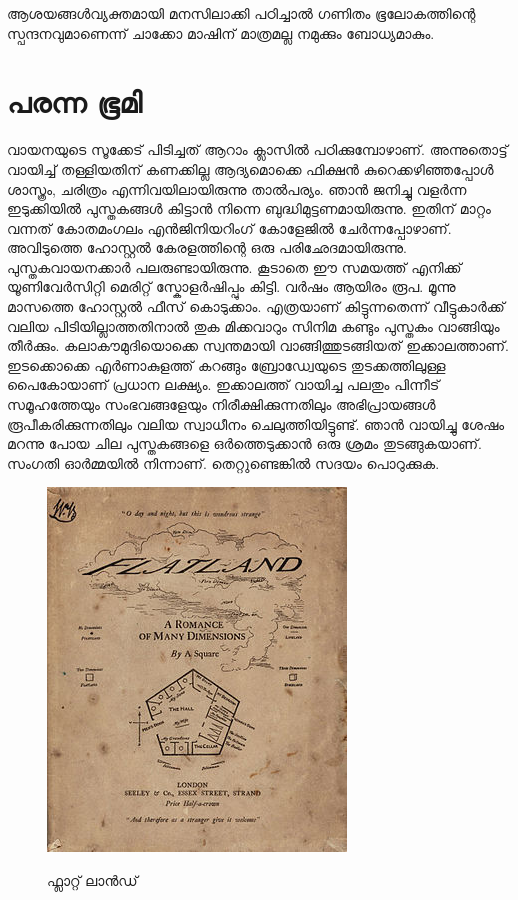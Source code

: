 \documentclass[10pt,a4paper]{report}
\begin{document}
      ആശയങ്ങൾവ്യക്തമായി മനസിലാക്കി പഠിച്ചാൽ ഗണിതം ഭൂലോകത്തിന്റെ സ്പന്ദനവുമാണെന്ന് ചാക്കോ മാഷിന് മാത്രമല്ല നമുക്കും ബോധ്യമാകും.
  
\section{പരന്ന ഭൂമി }

വായനയുടെ സൂക്കേട് പിടിച്ചത് ആറാം ക്ലാസിൽ പഠിക്കുമ്പോഴാണ്. അന്നുതൊട്ട് വായിച്ച് തള്ളിയതിന് കണക്കില്ല ആദ്യമൊക്കെ ഫിക്ഷൻ കുറെക്കഴിഞ്ഞപ്പോൾ ശാസ്ത്രം, ചരിത്രം എന്നിവയിലായിരുന്നു താൽപര്യം. ഞാൻ ജനിച്ചു വളർന്ന ഇടുക്കിയിൽ പുസ്തകങ്ങൾ കിട്ടാൻ നിന്നെ ബുദ്ധിമുട്ടണമായിരുന്നു. ഇതിന് മാറ്റം വന്നത് കോതമംഗലം എൻജിനിയറിംഗ് കോളേജിൽ ചേർന്നപ്പോഴാണ്. അവിടുത്തെ ഹോസ്റ്റൽ കേരളത്തിന്റെ ഒരു പരിഛേദമായിരുന്നു. പുസ്തകവായനക്കാർ പലരുണ്ടായിരുന്നു. കൂടാതെ ഈ സമയത്ത് എനിക്ക് യൂണിവേർസിറ്റി മെരിറ്റ് സ്കോളർഷിപ്പും കിട്ടി. വർഷം ആയിരം രൂപ. മൂന്നു മാസത്തെ ഹോസ്റ്റൽ ഫീസ് കൊടുക്കാം. എത്രയാണ് കിട്ടുന്നതെന്ന് വീട്ടുകാർക്ക് വലിയ പിടിയില്ലാത്തതിനാൽ തുക മിക്കവാറും സിനിമ കണ്ടും പുസ്തകം വാങ്ങിയും തീർക്കും. കലാകൗമുദിയൊക്കെ സ്വന്തമായി വാങ്ങിത്തുടങ്ങിയത് ഇക്കാലത്താണ്. ഇടക്കൊക്കെ എർണാകുളത്ത് കറങ്ങും ബ്രോഡ്വേയുടെ തുടക്കത്തിലുള്ള പൈകോയാണ് പ്രധാന ലക്ഷ്യം. ഇക്കാലത്ത് വായിച്ച പലതും പിന്നീട് സമൂഹത്തേയും സംഭവങ്ങളേയും നിരീക്ഷിക്കുന്നതിലും അഭിപ്രായങ്ങൾ രൂപീകരിക്കുന്നതിലും വലിയ സ്വാധീനം ചെലുത്തിയിട്ടുണ്ട്. ഞാൻ വായിച്ചു ശേഷം മറന്നു പോയ ചില പുസ്തകങ്ങളെ ഒർത്തെടുക്കാൻ ഒരു ശ്രമം തുടങ്ങുകയാണ്. സംഗതി ഓർമ്മയിൽ നിന്നാണ്. തെറ്റുണ്ടെങ്കിൽ സദയം പൊറുക്കുക.
    \begin{figure}[H]
  \center
\includegraphics[scale=.7]{images/flatland}
\label{flat1}
\caption{  ഫ്ലാറ്റ്  ലാൻഡ് }
\end{figure}
\end{document}
